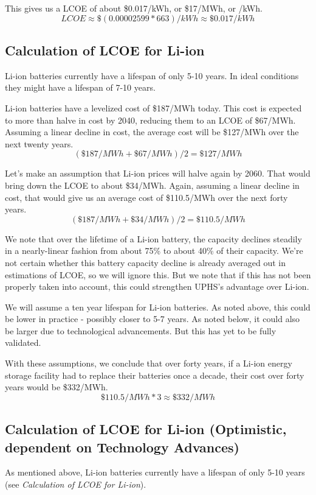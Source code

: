 This gives us a LCOE of about \$0.017/kWh, or \$17/MWh, or /kWh.
\[ LCOE \approx \$(0.00002599 * 663)/kWh \approx \$0.017/kWh \]


\subsection{Calculation of LCOE for Li-ion}
Li-ion batteries currently have a lifespan of only 5-10 years. \cite{The3BillionPlanToTurnHooverDamIntoAGiantBattery} In ideal conditions they might have a lifespan of 7-10 years. \cite{LifePredictionModelForLiIonBattery}

Li-ion batteries have a levelized cost of \$187/MWh today. This cost is expected to more than halve in cost by 2040, reducing them to an LCOE of \$67/MWh. Assuming a linear decline in cost, the average cost will be \$127/MWh over the next twenty years. \cite{NewEnergyOutlook2019Report}
\[ (\$187/MWh + \$67/MWh) / 2 =  \$127/MWh \]

Let's make an assumption that Li-ion prices will halve again by 2060. That would bring down the LCOE to about \$34/MWh. Again, assuming a linear decline in cost, that would give us an average cost of \$110.5/MWh over the next forty years.
\[ (\$187/MWh + \$34/MWh) / 2 =  \$110.5/MWh \]

We note that over the lifetime of a Li-ion battery, the capacity declines steadily in a nearly-linear fashion from about 75\% to about 40\% of their capacity. \cite{LifePredictionModelForLiIonBattery} We're not certain whether this battery capacity decline is already averaged out in estimations of LCOE, so we will ignore this. But we note that if this has not been properly taken into account, this could strengthen UPHS's advantage over Li-ion.

We will assume a ten year lifespan for Li-ion batteries. As noted above, this could be lower in practice - possibly closer to 5-7 years. As noted below, it could also be larger due to technological advancements. But this has yet to be fully validated.

With these assumptions, we conclude that over forty years, if a Li-ion energy storage facility had to replace their batteries once a decade, their cost over forty years would be \$332/MWh.
\[ \$110.5/MWh * 3 \approx \$332/MWh \]

\subsection{Calculation of LCOE for Li-ion (Optimistic, dependent on Technology Advances)}
As mentioned above, Li-ion batteries currently have a lifespan of only 5-10 years (see \textit{Calculation of LCOE for Li-ion}).

